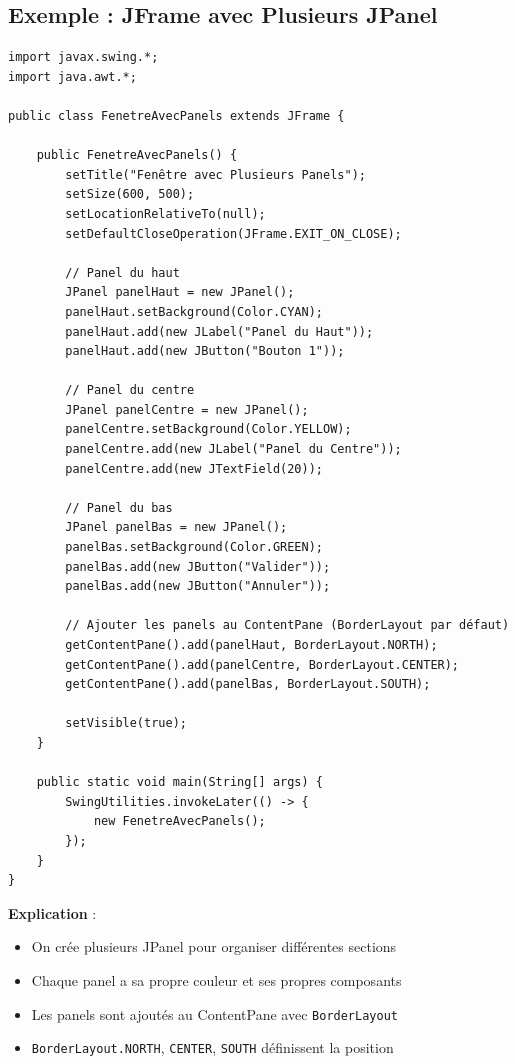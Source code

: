 \documentclass[11pt,a4paper]{article}
\begin{document}
\subsection{Exemple : JFrame avec Plusieurs JPanel}

\begin{lstlisting}
import javax.swing.*;
import java.awt.*;

public class FenetreAvecPanels extends JFrame {
    
    public FenetreAvecPanels() {
        setTitle("Fenêtre avec Plusieurs Panels");
        setSize(600, 500);
        setLocationRelativeTo(null);
        setDefaultCloseOperation(JFrame.EXIT_ON_CLOSE);
        
        // Panel du haut
        JPanel panelHaut = new JPanel();
        panelHaut.setBackground(Color.CYAN);
        panelHaut.add(new JLabel("Panel du Haut"));
        panelHaut.add(new JButton("Bouton 1"));
        
        // Panel du centre
        JPanel panelCentre = new JPanel();
        panelCentre.setBackground(Color.YELLOW);
        panelCentre.add(new JLabel("Panel du Centre"));
        panelCentre.add(new JTextField(20));
        
        // Panel du bas
        JPanel panelBas = new JPanel();
        panelBas.setBackground(Color.GREEN);
        panelBas.add(new JButton("Valider"));
        panelBas.add(new JButton("Annuler"));
        
        // Ajouter les panels au ContentPane (BorderLayout par défaut)
        getContentPane().add(panelHaut, BorderLayout.NORTH);
        getContentPane().add(panelCentre, BorderLayout.CENTER);
        getContentPane().add(panelBas, BorderLayout.SOUTH);
        
        setVisible(true);
    }
    
    public static void main(String[] args) {
        SwingUtilities.invokeLater(() -> {
            new FenetreAvecPanels();
        });
    }
}
\end{lstlisting}

\textbf{Explication} :
\begin{itemize}
    \item On crée plusieurs JPanel pour organiser différentes sections
    \item Chaque panel a sa propre couleur et ses propres composants
    \item Les panels sont ajoutés au ContentPane avec \texttt{BorderLayout}
    \item \texttt{BorderLayout.NORTH}, \texttt{CENTER}, \texttt{SOUTH} définissent la position
\end{itemize}
\end{document}
